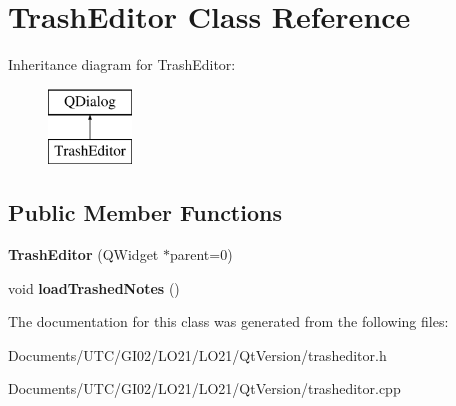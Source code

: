 \hypertarget{class_trash_editor}{}\section{Trash\+Editor Class Reference}
\label{class_trash_editor}
Inheritance diagram for Trash\+Editor\+:\begin{figure}[H]
\begin{center}
\leavevmode
\includegraphics[height=2.000000cm]{class_trash_editor}
\end{center}
\end{figure}
\subsection*{Public Member Functions}
\begin{DoxyCompactItemize}
\item 
\mbox{\label{class_trash_editor_a7a106bef91b37afbc201c7742986bdb5}} 
{\bfseries Trash\+Editor} (Q\+Widget $\ast$parent=0)
\item 
\mbox{\label{class_trash_editor_adebdb1b69887257d460f66e3de2ae24a}} 
void {\bfseries load\+Trashed\+Notes} ()
\end{DoxyCompactItemize}


The documentation for this class was generated from the following files\+:\begin{DoxyCompactItemize}
\item 
Documents/\+U\+T\+C/\+G\+I02/\+L\+O21/\+L\+O21/\+Qt\+Version/trasheditor.\+h\item 
Documents/\+U\+T\+C/\+G\+I02/\+L\+O21/\+L\+O21/\+Qt\+Version/trasheditor.\+cpp\end{DoxyCompactItemize}
